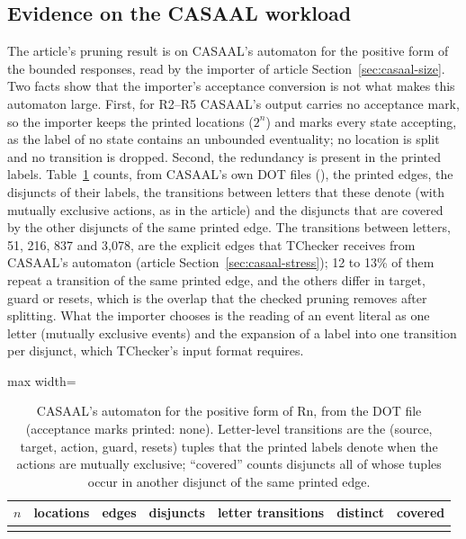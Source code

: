 \subsection{Evidence on the CASAAL workload}\label{sec:casaal-label-detail}
The article's pruning result is on CASAAL's automaton for the positive form of the bounded responses, read by the importer of article Section~\ref{sec:casaal-size}. Two facts show that the importer's acceptance conversion is not what makes this automaton large. First, for R2--R5 CASAAL's output carries no acceptance mark, so the importer keeps the printed locations ($2^n$) and marks every state accepting, as the label of no state contains an unbounded eventuality; no location is split and no transition is dropped. Second, the redundancy is present in the printed labels. Table~\ref{tab:casaal-label} counts, from CASAAL's own DOT files (), the printed edges, the disjuncts of their labels, the transitions between letters that these denote (with mutually exclusive actions, as in the article) and the disjuncts that are covered by the other disjuncts of the same printed edge. The transitions between letters, 51, 216, 837 and 3{,}078, are the explicit edges that TChecker receives from CASAAL's automaton (article Section~\ref{sec:casaal-stress}); 12 to 13\% of them repeat a transition of the same printed edge, and the others differ in target, guard or resets, which is the overlap that the checked pruning removes after splitting. What the importer chooses is the reading of an event literal as one letter (mutually exclusive events) and the expansion of a label into one transition per disjunct, which TChecker's input format requires.

\begin{table}[tp]
\centering
\caption{CASAAL's automaton for the positive form of Rn, from the DOT file (acceptance marks printed: none). Letter-level transitions are the (source, target, action, guard, resets) tuples that the printed labels denote when the actions are mutually exclusive; ``covered'' counts disjuncts all of whose tuples occur in another disjunct of the same printed edge.}
\label{tab:casaal-label}
\small
\begin{adjustbox}{max width=\textwidth}\begin{tabular}{@{}rrrrrrr@{}}
\toprule
$n$ & locations & edges & disjuncts & letter transitions & distinct & covered\\
\midrule
\\
\bottomrule
\end{tabular}\end{adjustbox}
\end{table}

